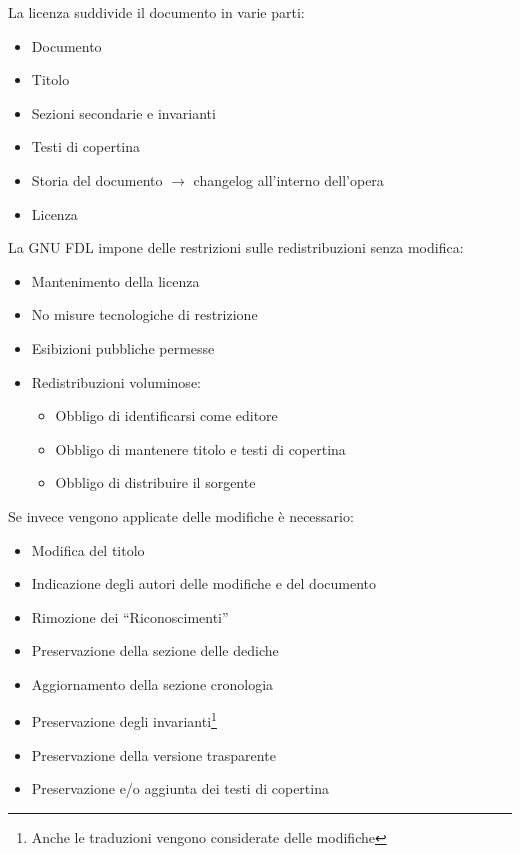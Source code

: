 La licenza suddivide il documento in varie parti:
\begin{itemize}
  
\item Documento
\item Titolo
\item Sezioni secondarie e invarianti
\item Testi di copertina
\item Storia del documento $\to$ changelog all'interno dell'opera
\item Licenza
  
\end{itemize}

La GNU FDL impone delle restrizioni sulle redistribuzioni senza modifica:
\begin{itemize}

\item Mantenimento della licenza
\item No misure tecnologiche di restrizione
\item Esibizioni pubbliche permesse
\item Redistribuzioni voluminose:
  \begin{itemize}

  \item Obbligo di identificarsi come editore
  \item Obbligo di mantenere titolo e testi di copertina
  \item Obbligo di distribuire il sorgente

  \end{itemize}

\end{itemize}

Se invece vengono applicate delle modifiche \`e necessario:
\begin{itemize}

\item Modifica del titolo
\item Indicazione degli autori delle modifiche e del documento
\item Rimozione dei ``Riconoscimenti''
\item Preservazione della sezione delle dediche
\item Aggiornamento della sezione cronologia
\item Preservazione degli invarianti\footnote{Anche le traduzioni vengono considerate delle modifiche}
\item Preservazione della versione trasparente
\item Preservazione e/o aggiunta dei testi di copertina

\end{itemize}

